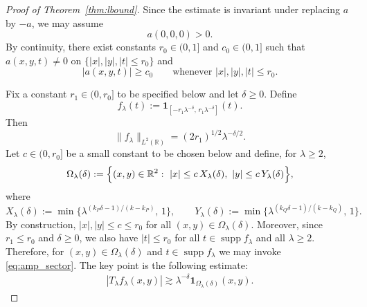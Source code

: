 \documentclass[10pt]{amsart}
\numberwithin{equation}{section}
\theoremstyle{definition}
\theoremstyle{remark}
\theoremstyle{remark}
\newcommand{\R}{\mathbb{R}}
\newcommand{\supp}{\operatorname{supp}}
\begin{document}
	\begin{proof}[Proof of Theorem~\ref{thm:lbound}]

		Since the estimate is invariant under replacing $a$ by $-a$,
        we may assume
        \[
        a(0,0,0)>0.
        \]
		By continuity, there exist constants $r_0\in(0,1]$ and $c_0\in(0,1]$ such that
		$a(x,y,t)\neq0$ on $\{|x|,|y|,|t|\le r_0\}$ and
		\begin{equation}\label{eq:amp_sector}
			|a(x,y,t)|\ge c_0
			\qquad\text{whenever }|x|,|y|,|t|\le r_0.
		\end{equation}
		
		Fix a constant $r_1\in(0,r_0]$ to be specified below and let $\delta\ge 0$.
		Define
		\begin{equation*}
			f_\lambda(t):=\mathbf{1}_{[-r_1\lambda^{-\delta},\,r_1\lambda^{-\delta}]}(t).
		\end{equation*}
		Then
		\begin{equation}\label{eq:test_L2_norm}
			\|f_\lambda\|_{L^2(\R)}=(2r_1)^{1/2}\lambda^{-\delta/2}.
		\end{equation}
		Let $c\in(0,r_0]$ be a small constant to be chosen below and define, for $\lambda\ge 2$,
		\begin{equation}\label{eq:Omega_def}
			\Omega_\lambda(\delta)
			:=\Bigl\{(x,y)\in\R^2:\ |x|\le c\,X_\lambda(\delta),\ |y|\le c\,Y_\lambda(\delta)\Bigr\},
		\end{equation}
		where
		\begin{equation}\label{eq:XY_def}
			X_\lambda(\delta):=\min\{\lambda^{(k_P\delta-1)/(k-k_P)},\,1\},\qquad
			Y_\lambda(\delta):=\min\{\lambda^{(k_Q\delta-1)/(k-k_Q)},\,1\}.
		\end{equation}
		By construction, $|x|,|y|\le c\le r_0$ for all $(x,y)\in\Omega_\lambda(\delta)$.
		Moreover, since $r_1\le r_0$ and $\delta\ge0$, we also have $|t|\le r_0$ for all
		$t\in\supp f_\lambda$ and all $\lambda\ge2$.
		Therefore, for $(x,y)\in\Omega_\lambda(\delta)$ and $t\in\supp f_\lambda$ we may invoke
		\eqref{eq:amp_sector}.
		The key point is the following estimate:
		\begin{align}\label{T:lbound}
			|T_\lambda f_\lambda(x,y)| \gtrsim \lambda^{-\delta} \mathbf{1}_{\Omega_\lambda(\delta)}(x,y).
		\end{align}
		


\end{proof}
\end{document}
